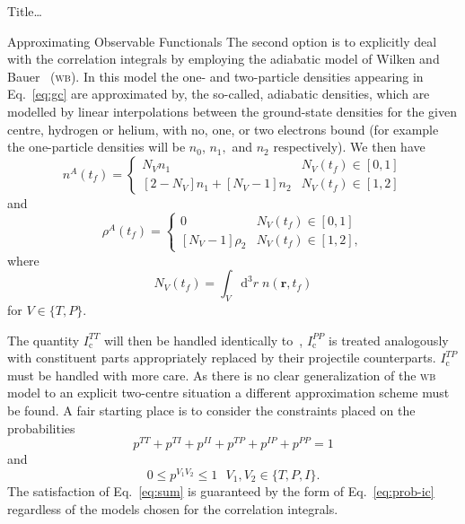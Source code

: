 \documentclass[letterpaper, 10 pt]{report}
\begin{document}
\begin{chapter}{ Title\dots \label{chap:p-he2p-he}}
\begin{section}{Approximating Observable Functionals \label{sec:phe2p-obs}}
      The second option is to explicitly deal with the correlation integrals by employing the adiabatic
      model of Wilken and Bauer~\cite{wb} (\textsc{wb}). In this model the one- and two-particle
      densities appearing in Eq.~\eqref{eq:gc} are approximated by, the so-called, adiabatic densities,
      which are modelled by linear interpolations between the ground-state densities for the given
      centre, hydrogen or helium, with no, one, or two electrons bound (for example the one-particle
      densities will be $n_0$, $ n_1,$ and $n_2$ respectively). We then have
      \begin{equation} \label{eq:n1a}
         n^{A} (t_f) = \begin{cases}
         N_V n_1 & N_V(t_f) \in [0,1] \\
         \left[ 2-N_V \right] n_1 + \left[ N_V-1 \right] n_2 & N_V(t_f) \in [1,2]
         \end{cases}
      \end{equation}
      and
      \begin{equation} \label{eq:p2a}
         \rho^{A} (t_f) =
         \begin{cases}
            0 & N_V(t_f) \in [0,1] \\
            \left[ N_V-1 \right] \rho_2 & N_V(t_f) \in [1,2],
         \end{cases}
      \end{equation}
      where
      \begin{equation} \label{eq:Nv}
         N_V(t_f) = \int_V \mathrm{d}^3 r \; n(\mathbf{r},t_f)
      \end{equation}
      for $V \in \{T,P\}$. 

      The quantity $I_\mathrm{c}^{TT}$ will then be handled identically to~\cite{pbarhe},
      $I_\mathrm{c}^{PP}$ is treated analogously with constituent parts appropriately replaced by their
      projectile counterparts. $I_\mathrm{c}^{TP}$ must be handled with more care. As there is no clear
      generalization of the \textsc{wb} model to an explicit two-centre situation a different
      approximation scheme must be found. A fair starting place is to consider the constraints placed on
      the probabilities
      \begin{equation} \label{eq:sum}
         p^{TT} + p^{TI} + p^{II} + p^{TP} + p^{IP} + p^{PP} = 1
      \end{equation}
      and
      \begin{equation} \label{eq:bound}
         0 \leq p^{V_1 V_2} \leq 1 ~ ~ ~ V_1, V_2 \in\{ T,P,I\}.
      \end{equation}
      The satisfaction of Eq.~\eqref{eq:sum} is guaranteed by the form of Eq.~\eqref{eq:prob-ic}
      regardless of the models chosen for the correlation integrals.


\end{section}
\end{chapter}
\end{document}
